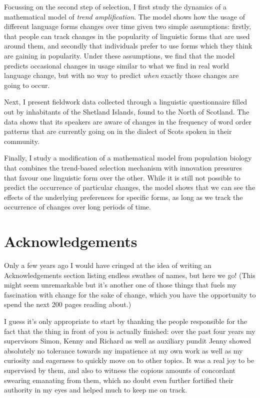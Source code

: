 \documentclass[twoside,10pt]{book}
\begin{document}
Focussing on the second step of selection, I first study the dynamics of a mathematical model of \emph{trend amplification}. The model shows how the usage of different language forms changes over time given two simple assumptions: firstly, that people can track changes in the popularity of linguistic forms that are used around them, and secondly that individuals prefer to use forms which they think are gaining in popularity. Under these assumptions, we find that the model predicts occasional changes in usage similar to what we find in real world language change, but with no way to predict \emph{when} exactly those changes are going to occur.

Next, I present fieldwork data collected through a linguistic questionnaire filled out by inhabitants of the Shetland Islands, found to the North of Scotland. The data shows that its speakers are aware of changes in the frequency of word order patterns that are currently going on in the dialect of Scots spoken in their community.

Finally, I study a modification of a mathematical model from population biology that combines the trend-based selection mechanism with innovation pressures that favour one linguistic form over the other. While it is still not possible to predict the occurrence of particular changes, the model shows that we can see the effects of the underlying preferences for specific forms, as long as we track the occurrence of changes over long periods of time.

\chapter{Acknowledgements}

Only a few years ago I would have cringed at the idea of writing an Acknowledgements section listing endless swathes of names, but here we go! (This might seem unremarkable but it's another one of those things that fuels my fascination with change for the sake of change, which you have the opportunity to spend the next 200 pages reading about.)

I guess it's only appropriate to start by thanking the people responsible for the fact that the thing in front of you is actually finished: over the past four years my supervisors Simon, Kenny and Richard as well as auxiliary pundit Jenny showed absolutely no tolerance towards my impatience at my own work as well as my curiosity and eagerness to quickly move on to other topics. It was a real joy to be supervised by them, and also to witness the copious amounts of concordant swearing emanating from them, which no doubt even further fortified their authority in my eyes and helped much to keep me on track.
\end{document}
